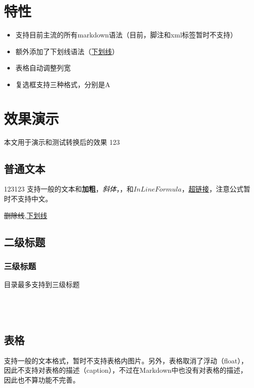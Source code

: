 \documentclass[UTF8]{ctexart}
\newenvironment{marktext}{}{}
\begin{document}
\normalsize
\tableofcontents
\newpage
\begin{marktext}
\section{特性}


\end{marktext}
\begin{itemize}
\item
支持目前主流的所有markdown语法（目前，脚注和xml标签暂时不支持）
\item
额外添加了下划线语法（\underline{下划线}）
\item
表格自动调整列宽
\item
复选框支持三种格式，分别是A
\end{itemize}
\begin{marktext}

\section{效果演示}
本文用于演示和测试转换后的效果
123
 
\subsection{普通文本}

123123
支持一般的文本和\textbf{加粗}，\textit{斜体}，，和$InLine Formula$，\href{http://github.com}{超链接}，注意公式暂时不支持中文。


\sout{删除线},\underline{下划线}


\subsection{二级标题}




\subsubsection{三级标题}


目录最多支持到三级标题
\\\\
\\\\






\subsection{表格}


支持一般的文本格式，暂时不支持表格内图片。另外，表格取消了浮动（float），因此不支持对表格的描述（caption），不过在Markdown中也没有对表格的描述，因此也不算功能不完善。


\end{marktext}
\end{document}
